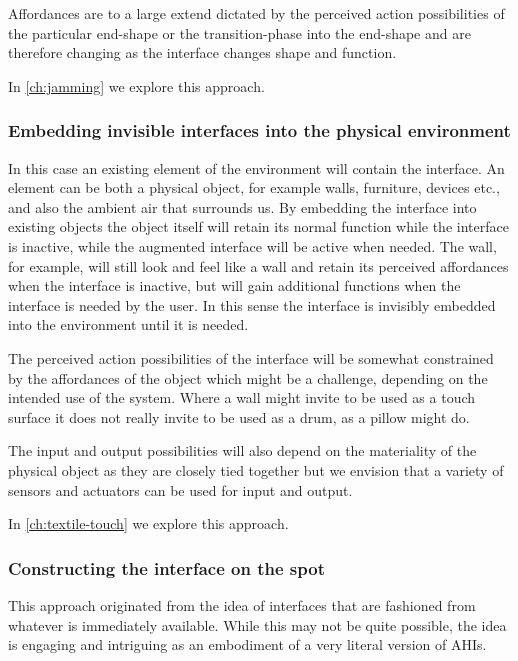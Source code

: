 Affordances are to a large extend dictated by the perceived action possibilities of the particular end-shape or the transition-phase into the end-shape and are therefore changing as the interface changes shape and function.

In \autoref{ch:jamming} we explore this approach.

\subsubsection{Embedding invisible interfaces into the physical environment}
In this case an existing element of the environment will contain the interface.
An element can be both a physical object, for example walls, furniture, devices etc., and also the ambient air  that surrounds us.
By embedding the interface into existing objects the object itself will retain its normal function while the interface is inactive, while the augmented interface will be active when needed. 
The wall, for example, will still look and feel like a wall and retain its perceived affordances when the interface is inactive, but will gain additional functions when the interface is needed by the user.
In this sense the interface is invisibly embedded into the environment until it is needed.

The perceived action possibilities of the interface will be somewhat constrained by the affordances of the object which might be a challenge, depending on the intended use of the system.
Where a wall might invite to be used as a touch surface it does not really invite to be used as a drum, as a pillow might do.

The input and output possibilities will also depend on the materiality of the physical object as they are closely tied together but we envision that a variety of sensors and actuators can be used for input and output.

In \autoref{ch:textile-touch} we explore this approach.

\subsubsection{Constructing the interface on the spot}
This approach originated from the idea of interfaces that are fashioned from whatever is immediately available.
While this may not be quite possible, the idea is engaging and intriguing as an embodiment of a very literal version of AHIs.

